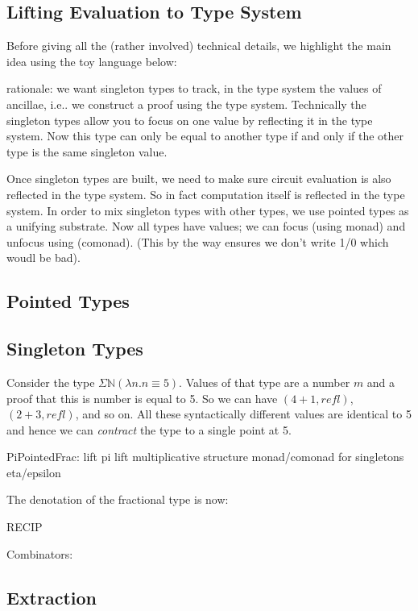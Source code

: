 \documentclass[sigplan,10pt,review,anonymous]{acmart}
\begin{document}
\subsection{Lifting Evaluation to Type System}

Before giving all the (rather involved) technical details, we
highlight the main idea using the toy language below:

\Jexample{}

rationale: we want singleton types to track, in the type system
the values of ancillae, i.e.. we construct a proof using the type
system. Technically the singleton types allow you to focus on one
value by reflecting it in the type system. Now this type can only be
equal to another type if and only if the other type is the same
singleton value.

Once singleton types are built, we need to make sure circuit
evaluation is also reflected in the type system. So in fact
computation itself is reflected in the type system. In order to mix
singleton types with other types, we use pointed types as a unifying
substrate. Now all types have values; we can focus (using monad) and
unfocus using (comonad). (This by the way ensures we don't write 1/0
which woudl be bad). 

\subsection{Pointed Types}
 
\subsection{Singleton Types}
 
Consider the type $\Sigma \mathbb{N} (\lambda n. n \equiv 5)$. Values
of that type are a number $m$ and a proof that this is number is equal
to 5. So we can have $(4 + 1, \textit{refl})$, $(2 + 3 ,
\textit{refl})$, and so on. All these syntactically different values
are identical to 5 and hence we can \emph{contract} the type to a
single point at 5. 

PiPointedFrac:
lift pi
lift multiplicative structure
monad/comonad for singletons
eta/epsilon

The denotation of the fractional type is now:

\PIPFUdef{}

RECIP 

Combinators:
\PIPFCombDef{}

\subsection{Extraction}
\end{document}
